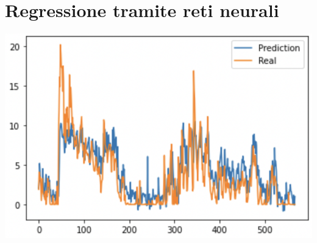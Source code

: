 \documentclass{article}
\begin{document}
\section{Regressione tramite reti neurali}
\includegraphics[scale = 0.5]{Immagini/Regressione1.PNG}
\end{document}
